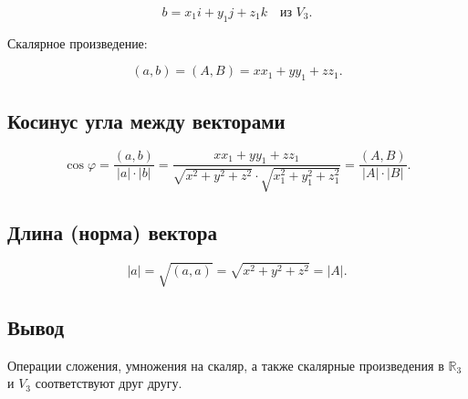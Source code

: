 {\[
b = x_1 i + y_1 j + z_1 k \quad \text{из } V_3.
\]

Скалярное произведение:

\[
(a, b) = (A, B) = x x_1 + y y_1 + z z_1.
\]

\subsection*{Косинус угла между векторами}

\[
\cos \varphi = \frac{(a, b)}{|a| \cdot |b|} = \frac{x x_1 + y y_1 + z z_1}{\sqrt{x^2 + y^2 + z^2} \cdot \sqrt{x_1^2 + y_1^2 + z_1^2}} = \frac{(A, B)}{|A| \cdot |B|}.
\]

\subsection*{Длина (норма) вектора}

\[
|a| = \sqrt{(a, a)} = \sqrt{x^2 + y^2 + z^2} = |A|.
\]



\subsection*{Вывод}

Операции сложения, умножения на скаляр, а также скалярные произведения в \( \mathbb{R}_3 \) и \( V_3 \) соответствуют друг другу.
}